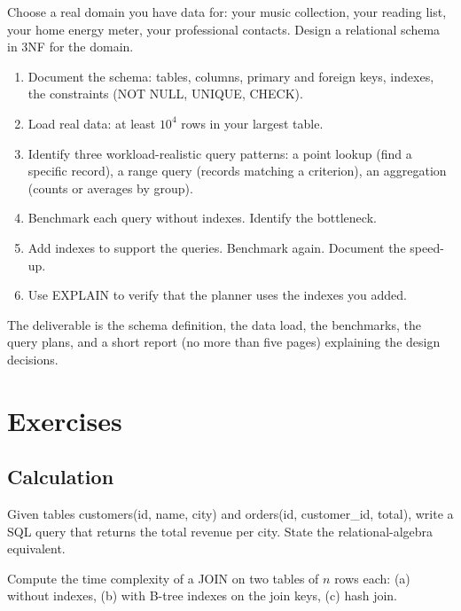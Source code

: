 \begin{project}
Choose a real domain you have data for: your music collection, your reading list, your home energy meter, your professional contacts. Design a relational schema in 3NF for the domain.

\begin{enumerate}[leftmargin=*]
  \item Document the schema: tables, columns, primary and foreign keys, indexes, the constraints (NOT NULL, UNIQUE, CHECK).
  \item Load real data: at least $10^4$ rows in your largest table.
  \item Identify three workload-realistic query patterns: a point lookup (find a specific record), a range query (records matching a criterion), an aggregation (counts or averages by group).
  \item Benchmark each query without indexes. Identify the bottleneck.
  \item Add indexes to support the queries. Benchmark again. Document the speed-up.
  \item Use EXPLAIN to verify that the planner uses the indexes you added.
\end{enumerate}

The deliverable is the schema definition, the data load, the benchmarks, the query plans, and a short report (no more than five pages) explaining the design decisions.
\end{project}

\section{Exercises}

\subsection*{Calculation}

\begin{exercise}
Given tables customers(id, name, city) and orders(id, customer\_id, total), write a SQL query that returns the total revenue per city. State the relational-algebra equivalent.
\end{exercise}

\begin{exercise}
Compute the time complexity of a JOIN on two tables of $n$ rows each: (a) without indexes, (b) with B-tree indexes on the join keys, (c) hash join.
\end{exercise}

